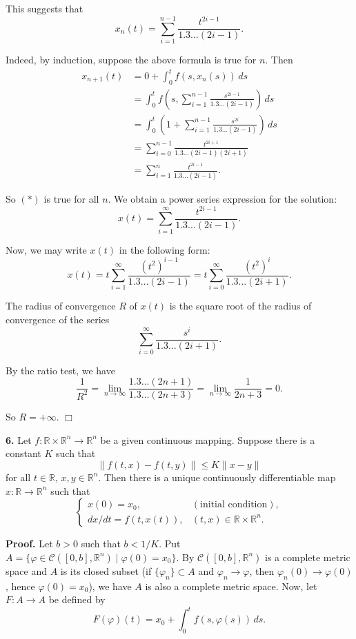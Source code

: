 \documentclass{article}
\begin{document}
This suggests that
\[\tag{*} x_n(t) = \sum_{i = 1}^{n-1} \frac{t^{2i-1}}{1.3\ldots  (2i-1)}.\]

Indeed, by induction, suppose the above formula is true for $n$. Then
\[\begin{aligned}
x_{n+1}(t) &= 0 + \int_0^t f(s,x_n(s))\,ds\\
&= \int_0^t f\left(s, \sum_{i = 1}^{n-1} \frac{s^{2i-1}}{1.3\ldots  (2i-1)}\right) \, ds\\
&= \int_0^t \left(1 + \sum_{i=1}^{n-1} \frac{s^{2i}}{1.3\ldots (2i-1)} \right)\, ds \\
&= \sum_{i=0}^{n-1} \frac{t^{2i+1}}{1.3\ldots (2i-1)(2i+1)}\\
& = \sum_{i=1}^n \frac{t^{2i-1}}{1.3\ldots (2i-1)}.
\end{aligned}\]

So $(*)$ is true for all $n$. We obtain a power series expression for
the solution:
\[x(t) = \sum_{i = 1}^{\infty} \frac{t^{2i-1}}{1.3\ldots (2i-1)}.\]

Now, we may write $x(t)$ in the following form:
\[x(t) = t\sum_{i = 1}^{\infty} \frac{(t^2)^{i-1}}{1.3\ldots (2i-1)} = t \sum_{i = 0}^{\infty} \frac{(t^2)^i}{1.3\ldots (2i+1)}.\]

The radius of convergence $R$ of $x(t)$ is the square root of the radius
of convergence of the series \[
\sum_{i=0}^{\infty} \frac{s^i}{1.3\ldots (2i+1)}.
\]

By the ratio test, we have
\[\frac{1}{R^2} = \lim_{n\to \infty} \frac{{1.3\ldots  (2n+1)}}{1.3\ldots  (2n+3)} = \lim_{n\to\infty} \frac{1}{2n+3}= 0.\]

So $R = +\infty$. $\Box$

    \textbf{6.} Let $f : \mathbb{R} \times \mathbb{R}^n \to \mathbb{R}^n$ be
a given continuous mapping. Suppose there is a constant $K$ such that
\[\|f (t, x) − f (t, y)\| ≤ K \| x − y\|\] for all $t \in \mathbb{R}$,
$x, y \in \mathbb{R}^n$. Then there is a unique continuously
differentiable map $x : \mathbb{R} \to \mathbb{R}^n$ such that
\[\begin{cases}
x(0) = x_0, & (\text{initial condition}),\\
dx/dt = f(t,x(t)), & (t,x) \in \mathbb{R} \times \mathbb{R}^n.
\end{cases}\]

    \textbf{Proof.} Let $b > 0$ such that $b < 1/K$. Put
$A = \{\varphi \in \mathcal{C}([0,b], \mathbb{R}^n) \mid \varphi(0) = x_0\}$.
By $\mathcal{C}([0,b], \mathbb{R}^n)$ is a complete metric space and $A$
is its closed subset (if $\{\varphi_n \}\subset A$ and
$\varphi_n \to \varphi$, then $\varphi_n(0) \to \varphi(0)$, hence
$\varphi(0) = x_0$), we have $A$ is also a complete metric space. Now,
let $F :A \to A$ be defined by
\[ F(\varphi) (t) = x_0 + \int_0^t f(s, \varphi(s))\, ds.\]
\end{document}
